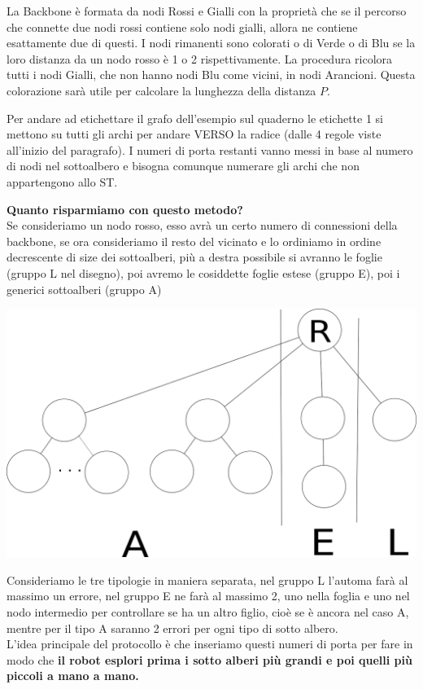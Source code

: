 La Backbone è formata da nodi Rossi e Gialli con la proprietà che se il percorso
che connette due nodi rossi contiene solo nodi gialli, allora ne contiene
esattamente due di questi. I nodi rimanenti sono colorati o di Verde o di Blu se
la loro distanza da un nodo rosso è 1 o 2 rispettivamente. La procedura ricolora
tutti i nodi Gialli, che non hanno nodi Blu come vicini, in nodi Arancioni.
Questa colorazione sarà utile per calcolare la lunghezza della distanza $P$.

Per andare ad etichettare il grafo dell'esempio sul quaderno le etichette 1 si
mettono su tutti gli archi per andare VERSO la radice (dalle 4 regole viste
all'inizio del paragrafo). I numeri di porta restanti vanno messi in base al
numero di nodi nel sottoalbero e bisogna comunque numerare gli archi che non
appartengono allo ST.

\textbf{Quanto risparmiamo con questo metodo?}\\
Se consideriamo un nodo rosso, esso avrà un certo numero di connessioni della
backbone, se ora consideriamo il resto del vicinato e lo ordiniamo in ordine
decrescente di size dei sottoalberi, più a destra possibile si avranno le foglie
(gruppo L nel disegno), poi avremo le cosiddette foglie estese (gruppo E), poi i
generici sottoalberi (gruppo A)

\begin{center}
    \includegraphics[scale=0.15]{capitoli/esplorazione-grafo-anonimo/imgs/automa1.png}
\end{center}

Consideriamo le tre tipologie in maniera separata, nel gruppo L l'automa farà al
massimo un errore, nel gruppo E ne farà al massimo 2, uno nella foglia e uno nel
nodo intermedio per controllare se ha un altro figlio, cioè se è ancora nel caso
A, mentre per il tipo A saranno 2 errori per ogni tipo di sotto albero.\\ L'idea
principale del protocollo è che inseriamo questi numeri di porta per fare in
modo che \textbf{il robot esplori prima i sotto alberi più grandi e poi quelli
    più piccoli a mano a mano.}

